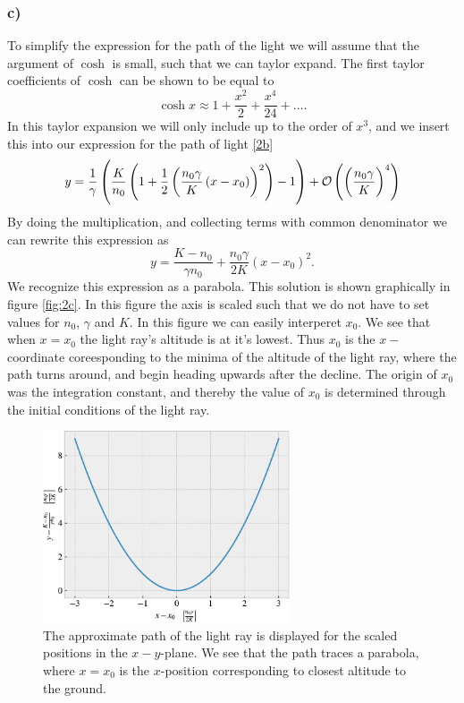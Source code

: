 \documentclass[12pt,twoside]{article}
\DeclareRobustCommand{\bigO}{%
  \text{\usefont{OMS}{cmsy}{m}{n}O}%
}
\begin{document}
\subsubsection*{c)}
To simplify the expression for the path of the light we will assume that the argument of $\cosh{}$ is small, such that we can taylor expand. The first taylor coefficients of $\cosh{}$ can be shown to be equal to
\begin{equation}
  \cosh{x}\approx1+\frac{x^2}{2} + \frac{x^4}{24} + \ldots.
\end{equation}
In this taylor expansion we will only include up to the order of $x^3$, and we insert this into our expression for the path of light \eqref{2b}
\begin{equation}
   y = \frac{1}{\gamma}\left(\frac{K}{n_0}\left(1+\frac{1}{2}\left(\frac{n_0\gamma}{K}\left(x-x_0\right)\right)^2 \right)-1\right) + \bigO\left(\left(\frac{n_0\gamma}{K}\right)^4\right)
\end{equation}
By doing the multiplication, and collecting terms with common denominator we can rewrite this expression as
\begin{equation}
   y = \frac{K-n_0}{\gamma n_0} + \frac{n_0\gamma}{2K}\left(x-x_0\right)^2.
\end{equation}
We recognize this expression as a parabola. This solution is shown graphically in figure \vref{fig:2c}. In this figure the axis is scaled such that we do not have to set values for $n_0$, $\gamma$ and $K$. In this figure we can easily interperet $x_0$. We see that when $x=x_0$ the light ray's altitude is at it's lowest. Thus $x_0$ is the $x-$coordinate coreesponding to the minima of the altitude of the light ray, where the path turns around, and begin heading upwards after the decline. The origin of $x_0$ was the integration constant, and thereby the value of $x_0$ is determined through the initial conditions of the light ray.
\begin{figure}
  \centering
  \includegraphics[width=0.65\textwidth]{../figures/2c.pdf}
  \caption{The approximate path of the light ray is displayed for the scaled positions in the $x-y$-plane. We see that the path traces a parabola, where $x=x_0$ is the $x$-position corresponding to closest altitude to the ground.}
  \label{fig:2c}
\end{figure}
\end{document}
